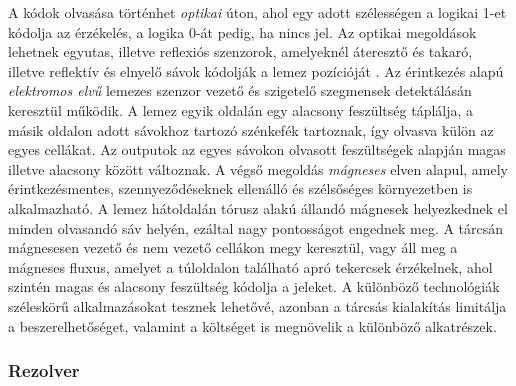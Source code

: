 A kódok olvasása történhet \textit{optikai} úton, ahol egy adott szélességen a logikai 1-et kódolja az érzékelés, a logika 0-át pedig, ha nincs jel. Az optikai megoldások lehetnek egyutas, illetve reflexiós szenzorok, amelyeknél áteresztő és takaró, illetve reflektív és elnyelő sávok kódolják a lemez pozícióját \cite{Morris2016b}. Az érintkezés alapú \textit{elektromos elvű} lemezes szenzor vezető és szigetelő szegmensek detektálásán keresztül működik. A lemez egyik oldalán egy alacsony feszültség táplálja, a másik oldalon adott sávokhoz tartozó szénkefék tartoznak, így olvasva külön az egyes cellákat. Az outputok az egyes sávokon olvasott feszültségek alapján magas illetve alacsony között változnak. A végső megoldás \textit{mágneses} elven alapul, amely érintkezésmentes, szennyeződéseknek ellenálló és szélsőséges környezetben is alkalmazható. A lemez hátoldalán tórusz alakú állandó mágnesek helyezkednek el minden olvasandó sáv helyén, ezáltal nagy pontosságot engednek meg. A tárcsán mágnesesen vezető és nem vezető cellákon megy keresztül, vagy áll meg a mágneses fluxus, amelyet a túloldalon található apró tekercsek érzékelnek, ahol szintén magas és alacsony feszültség kódolja a jeleket. A különböző technológiák széleskörű alkalmazásokat tesznek lehetővé, azonban a tárcsás kialakítás limitálja a beszerelhetőséget, valamint a költséget is megnövelik a különböző alkatrészek.

\subsubsection{Rezolver}


